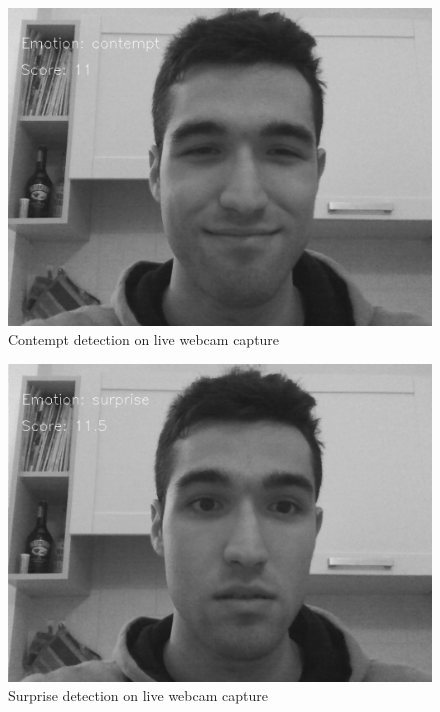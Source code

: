 \begin{figure}
  \centering
  \includegraphics{./images/db_contempt.png}
  \caption{Contempt detection on live webcam capture}
  \label{fig:exampl_contempt}
\end{figure}

\begin{figure}
  \centering
  \includegraphics{./images/db_surprise.png}
  \caption{Surprise detection on live webcam capture}
  \label{fig:exampl_surprise}
\end{figure}
\newpage
